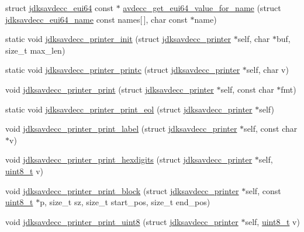 \begin{DoxyCompactItemize}
\item 
struct \hyperlink{structjdksavdecc__eui64}{jdksavdecc\+\_\+eui64} const $\ast$ \hyperlink{group__util_ga2b13d7257ce6a68046e0df22477ec802}{avdecc\+\_\+get\+\_\+eui64\+\_\+value\+\_\+for\+\_\+name} (struct \hyperlink{structjdksavdecc__eui64__name}{jdksavdecc\+\_\+eui64\+\_\+name} const names\mbox{[}$\,$\mbox{]}, char const $\ast$name)
\item 
static void \hyperlink{group__util_ga0cccc8d60f9a258f2e0045f918b6b8d1}{jdksavdecc\+\_\+printer\+\_\+init} (struct \hyperlink{structjdksavdecc__printer}{jdksavdecc\+\_\+printer} $\ast$self, char $\ast$buf, size\+\_\+t max\+\_\+len)
\item 
static void \hyperlink{group__util_ga24b25588730b43333c7b35cecc8f581d}{jdksavdecc\+\_\+printer\+\_\+printc} (struct \hyperlink{structjdksavdecc__printer}{jdksavdecc\+\_\+printer} $\ast$self, char v)
\item 
void \hyperlink{group__util_ga335ac75e0aa3fe66501b752bf9d0f90d}{jdksavdecc\+\_\+printer\+\_\+print} (struct \hyperlink{structjdksavdecc__printer}{jdksavdecc\+\_\+printer} $\ast$self, const char $\ast$fmt)
\item 
static void \hyperlink{group__util_gacda56c9d3d24593a52c999682fa6e6e3}{jdksavdecc\+\_\+printer\+\_\+print\+\_\+eol} (struct \hyperlink{structjdksavdecc__printer}{jdksavdecc\+\_\+printer} $\ast$self)
\item 
void \hyperlink{group__util_gaf7818b24143b3c7502926a425a242ff5}{jdksavdecc\+\_\+printer\+\_\+print\+\_\+label} (struct \hyperlink{structjdksavdecc__printer}{jdksavdecc\+\_\+printer} $\ast$self, const char $\ast$v)
\item 
void \hyperlink{group__util_ga6ee1e417ed3ee0efc12d4ed87e38c405}{jdksavdecc\+\_\+printer\+\_\+print\+\_\+hexdigits} (struct \hyperlink{structjdksavdecc__printer}{jdksavdecc\+\_\+printer} $\ast$self, \hyperlink{stdint_8h_aba7bc1797add20fe3efdf37ced1182c5}{uint8\+\_\+t} v)
\item 
void \hyperlink{group__util_ga18d7b11e396f21996dedde77febcb22f}{jdksavdecc\+\_\+printer\+\_\+print\+\_\+block} (struct \hyperlink{structjdksavdecc__printer}{jdksavdecc\+\_\+printer} $\ast$self, const \hyperlink{stdint_8h_aba7bc1797add20fe3efdf37ced1182c5}{uint8\+\_\+t} $\ast$p, size\+\_\+t sz, size\+\_\+t start\+\_\+pos, size\+\_\+t end\+\_\+pos)
\item 
void \hyperlink{group__util_ga00205f7730fc39a5b93655a3b18a8dc7}{jdksavdecc\+\_\+printer\+\_\+print\+\_\+uint8} (struct \hyperlink{structjdksavdecc__printer}{jdksavdecc\+\_\+printer} $\ast$self, \hyperlink{stdint_8h_aba7bc1797add20fe3efdf37ced1182c5}{uint8\+\_\+t} v)

\end{DoxyCompactItemize}

